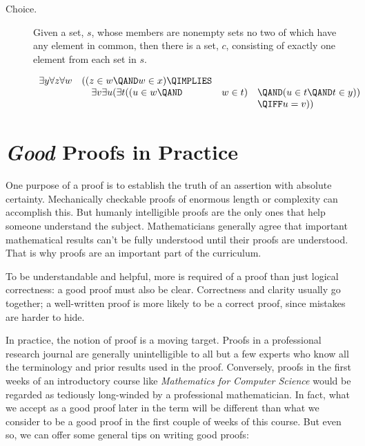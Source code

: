 {\begin{description}
\item[Choice.]  Given a set, $s$, whose members are nonempty sets no two
  of which have any element in common, then there is a set, $c$,
  consisting of exactly one element from each set in $s$.


\[\begin{array}{rlll}
\exists y \forall z \forall w & ( (z \in w \QAND w \in x) \QIMPLIES\\
                              &\quad \exists v \exists u (\exists t
                                           ((u \in w \QAND & w \in t)
                                                              & \QAND (u \in t \QAND t \in y))\\
                                                            &&& \QIFF u = v))
\end{array}\]

\end{description}
}
\newpage

\section{\emph{Good} Proofs in Practice}

One purpose of a proof is to establish the truth of an assertion with
absolute certainty.  Mechanically checkable proofs of enormous length or
complexity can accomplish this.  But humanly intelligible proofs are the
only ones that help someone understand the subject.  Mathematicians
generally agree that important mathematical results can't be fully
understood until their proofs are understood.  That is why proofs are an
important part of the curriculum.

To be understandable and helpful, more is required of a proof than just
logical correctness: a good proof must also be clear.  Correctness and
clarity usually go together; a well-written proof is more likely to be a
correct proof, since mistakes are harder to hide.

In practice, the notion of proof is a moving target.  Proofs in a
professional research journal are generally unintelligible to all but
a few experts who know all the terminology and prior results used in
the proof.  Conversely, proofs in the first weeks of an introductory
course like \emph{Mathematics
for Computer Science} would be regarded as tediously
long-winded by a professional mathematician.  In fact, what we accept
as a good proof later in the term will be different than what we
consider to be a good proof in the first couple of weeks of this
course. But even so, we can offer some
general tips on writing good proofs:

